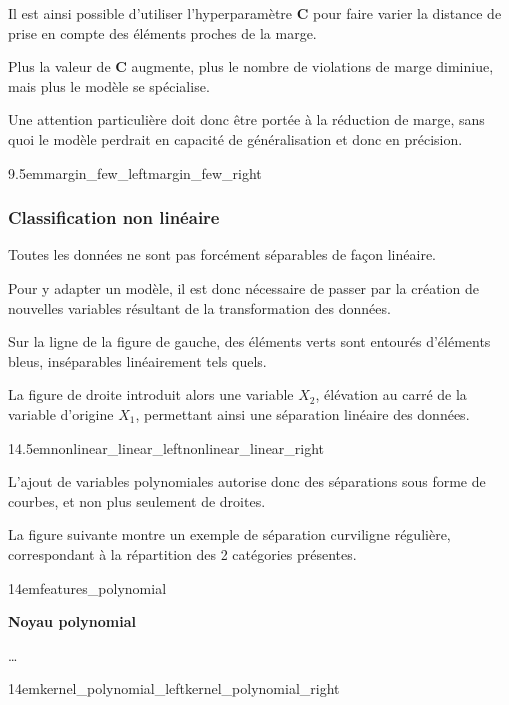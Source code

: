 Il est ainsi possible d’utiliser l’hyperparamètre \textbf{C} pour faire
varier la distance de prise en compte des éléments proches de la marge.

Plus la valeur de \textbf{C} augmente, plus le nombre de violations de
marge diminiue, mais plus le modèle se spécialise.

Une attention particulière doit donc être portée à la réduction de marge,
sans quoi le modèle perdrait en capacité de généralisation
et donc en précision.

{9.5em}{margin_few_left}{margin_few_right}

\pagebreak

\subsubsection{Classification non linéaire}

Toutes les données ne sont pas forcément séparables de façon linéaire.

Pour y adapter un modèle, il est donc nécessaire de passer par la création
de nouvelles variables résultant de la transformation des données.

Sur la ligne de la figure de gauche, des éléments verts sont entourés d’éléments bleus, inséparables linéairement tels quels.

La figure de droite introduit alors une variable $X_{2}$, élévation
au carré de la variable d’origine $X_{1}$, permettant ainsi
une séparation linéaire des données.

{14.5em}{nonlinear_linear_left}{nonlinear_linear_right}

L’ajout de variables polynomiales autorise donc des séparations sous
forme de courbes, et non plus seulement de droites.

La figure suivante montre un exemple de séparation curviligne régulière,
correspondant à la répartition des 2 catégories présentes.

{14em}{features_polynomial}

\pagebreak

\textbf{Noyau polynomial}

…

{14em}{kernel_polynomial_left}{kernel_polynomial_right}

